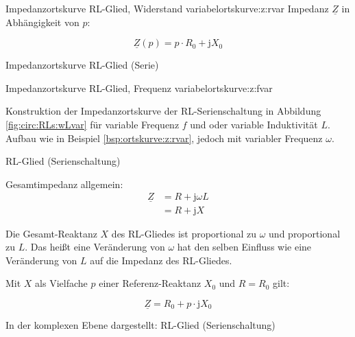 {\begin{frame}
\begin{bsp}{
    Impedanzortskurve RL-Glied, Widerstand variabel}{ortskurve:z:rvar}
    Impedanz $\underline{Z}$ in Abhängigkeit von $p$:

    \begin{equation*}
        \underline{Z}(p) = p \cdot R_0 + \mathrm{j}X_0
    \end{equation*}

        {Impedanzortskurve RL-Glied (Serie)\label{fig:plot:rls:Rvar}}

\end{bsp}

\begin{bsp}{Impedanzortskurve RL-Glied, Frequenz variabel}{ortskurve:z:fvar}%

    Konstruktion der Impedanzortskurve der RL-Serienschaltung in Abbildung \ref{fig:circ:RLs:wLvar} 
    für variable Frequenz $f$ und oder variable Induktivität $L$.
    Aufbau wie in Beispiel \ref{bsp:ortskurve:z:rvar}, jedoch mit variabler Frequenz $\omega$.

    {RL-Glied (Serienschaltung)\label{fig:circ:RLs:wLvar}}

    Gesamtimpedanz allgemein: 
    \begin{align*}
        \underline{Z}   &= R + \mathrm{j}\omega L \\
                        &= R + \mathrm{j}X
    \end{align*}

    Die Gesamt-Reaktanz $X$ des RL-Gliedes ist proportional zu $\omega$ und proportional zu $L$.
    Das heißt eine Veränderung von $\omega$ hat den selben Einfluss wie eine Veränderung von $L$ 
    auf die Impedanz des RL-Gliedes.
    
    Mit $X$ als Vielfache $p$ einer Referenz-Reaktanz $X_0$ und $R=R_0$ gilt:

    \begin{equation*}
        \underline{Z} = R_0 + p \cdot \mathrm{j}X_0 
    \end{equation*}

    In der komplexen Ebene dargestellt:
        {RL-Glied (Serienschaltung)}

\end{bsp}
\end{frame}
}%
